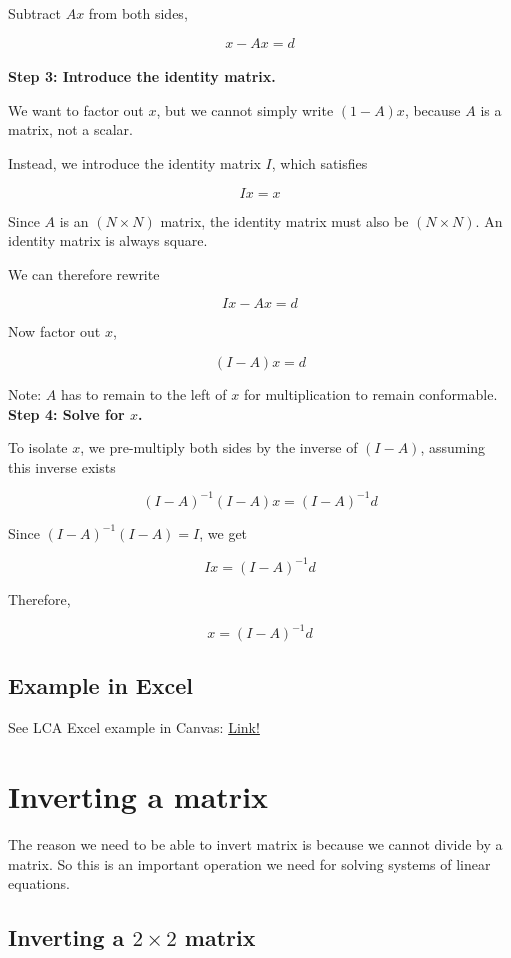 \documentclass[12pt]{article}
\begin{document}
Subtract $Ax$ from both sides,

\[
x - Ax = d
\]\\

\textbf{Step 3: Introduce the identity matrix.}

We want to factor out $x$, but we cannot simply write $(1-A)x$, because $A$ is a matrix, not a scalar.

Instead, we introduce the identity matrix $I$, which satisfies

\[
Ix = x
\]

Since $A$ is an $(N \times N)$ matrix, the identity matrix must also be $(N \times N)$. An identity matrix is always square.

We can therefore rewrite

\[
Ix - Ax = d
\]

Now factor out $x$,

\[
(I-A)x = d
\]

Note: $A$ has to remain to the left of $x$ for multiplication to remain conformable.\\

\textbf{Step 4: Solve for $x$.}

To isolate $x$, we pre-multiply both sides by the inverse of $(I-A)$, assuming this inverse exists

\[
(I-A)^{-1}(I-A)x = (I-A)^{-1}d
\]

Since $(I-A)^{-1}(I-A) = I$, we get

\[
Ix = (I-A)^{-1}d
\]

Therefore,

\[
\boxed{x = (I-A)^{-1}d}
\]

\subsection{Example in Excel}

See LCA Excel example in Canvas: \href{https://yale.instructure.com/courses/121587/files/12937814?module_item_id=1152749}{Link!}\\


\section{Inverting a matrix}
The reason we need to be able to invert matrix is because we cannot divide by a matrix. So this is an important operation we need for solving systems of linear equations. 


\subsection{Inverting a $2 \times 2$ matrix}
\end{document}
